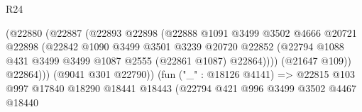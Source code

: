 \begin{lexlean}{R24}
\begin{coremodule}
                                              (@22880
                                                (@22887
                                                  (@22893
                                                    @22898
                                                    (@22888
                                                      @1091
                                                      @3499
                                                      @3502
                                                      @4666
                                                      @20721
                                                      @22898
                                                      (@22842
                                                        @1090
                                                        @3499
                                                        @3501
                                                        @3239
                                                        @20720
                                                        @22852
                                                        (@22794
                                                          @1088
                                                          @431
                                                          @3499
                                                          @3499
                                                          @1087
                                                          @2555
                                                          (@22861 @1087)
                                                          @22864))))
                                                  (@21647 @109))
                                                @22864)))
                                          (@9041 @301 @22790))
                                        (fun ("_" : @18126 @4141) =>
                                        @22815
                                          @103
                                          @997
                                          @17840
                                          @18290
                                          @18441
                                          @18443
                                          (@22794
                                            @421
                                            @996
                                            @3499
                                            @3502
                                            @4467
                                            @18440

\end{coremodule}
\end{lexlean}
